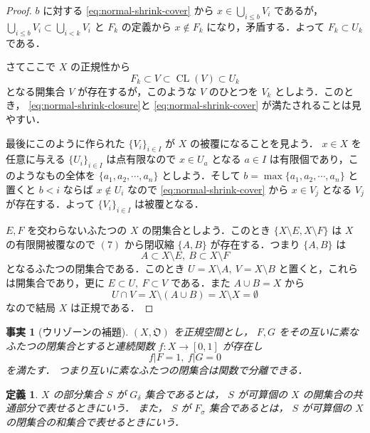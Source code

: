 \documentclass[leqno, 12pt]{ltjsarticle}
\newtheorem{df}[thm]{定義}
\newtheorem{fact}[thm]{事実}
\newcommand{\To}{\Longrightarrow}
\DeclareMathOperator{\cl}{CL}
\begin{document}
\begin{proof}
$b$
に対する
\eqref{eq:normal-shrink-cover}
から
$x\in \bigcup_{i\le b}V_{i}$
であるが，
$\bigcup_{i\le b}V_{i}\subset \bigcup_{i<k}V_{i}$
と
$F_{k}$
の定義から
$x\notin F_{k}$
になり，矛盾する．よって
$F_{k}\subset U_{k}$
である．\par
さてここで
$X$
の正規性から
\[
F_{k}\subset V\subset \cl(V)\subset U_{k}
\]
となる開集合
$V$
が存在するが，このような
$V$
のひとつを
$V_{k}$
としよう．このとき，
\eqref{eq:normal-shrink-closure}と
\eqref{eq:normal-shrink-cover}
が満たされることは見やすい．\par
最後にこのように作られた
$\{V_{i}\}_{i\in I}$
が
$X$
の被覆になることを見よう．
$x\in X$
を任意に与える
$\{U_{i}\}_{i\in I}$
は点有限なので
$x\in U_{a}$
となる
$a\in I$
は有限個であり，このようなもの全体を
$\{a_{1},a_{2},\cdots,a_{n}\}$
としよう．そして
$b=\max\{a_{1},a_{2},\cdots ,a_{n}\}$
と置くと
$b<i$
ならば
$x\notin U_{i}$
なので
\eqref{eq:normal-shrink-cover}
から
$x\in V_{j}$
となる
$V_{j}$
が存在する．よって
$\{V_{i}\}_{i\in I}$
は被覆となる．
\par
[$\ref{item:0723:normal}\To\ref{item:0723:ptfinopenshrink}$
の証明終わり]\par
[$\ref{item:0723:finclosedshrink}\To\ref{item:0723:normal}$
の証明]\par
$E,F$
を交わらないふたつの
$X$
の閉集合としよう．このとき
$\{X\setminus E,X\setminus F\}$
は
$X$
の有限開被覆なので
$(7)$
から閉収縮
$\{A,B\}$
が存在する．つまり
$\{A,B\}$
は
\[
A\subset X\setminus E,\ B\subset X\setminus F
\]
となるふたつの閉集合である．このとき
$U=X\setminus A,\ V=X\setminus B$
と置くと，これらは開集合であり，更に
$E\subset U,\ F\subset V$
である．また
$A\cup B=X$
から
\[
U\cap V=X\setminus (A\cup B)=X\setminus X=\emptyset
\]
なので結局
$X$
は正規である．
\par
[$\ref{item:0723:finclosedshrink}\To\ref{item:0723:normal}$
の証明終わり]\par
\end{proof}

\begin{fact}[ウリゾーンの補題]
$(X,\mathfrak{O})$
を正規空間とし，
$F,G$
をその互いに素なふたつの閉集合とすると連続関数
$f:X\to [0,1]$
が存在し
\[
f|F=1,\ f|G=0
\]
を満たす．
つまり互いに素なふたつの閉集合は関数で分離できる．
\end{fact}

\begin{df}
$X$
の部分集合
$S$
が
$G_{\delta}$
集合であるとは，
$S$
が可算個の
$X$
の開集合の共通部分で表せるときにいう．
また，
$S$
が
$F_{\sigma}$
集合であるとは，
$S$
が可算個の
$X$
の閉集合の和集合で表せるときにいう．
\end{df}
\end{document}
